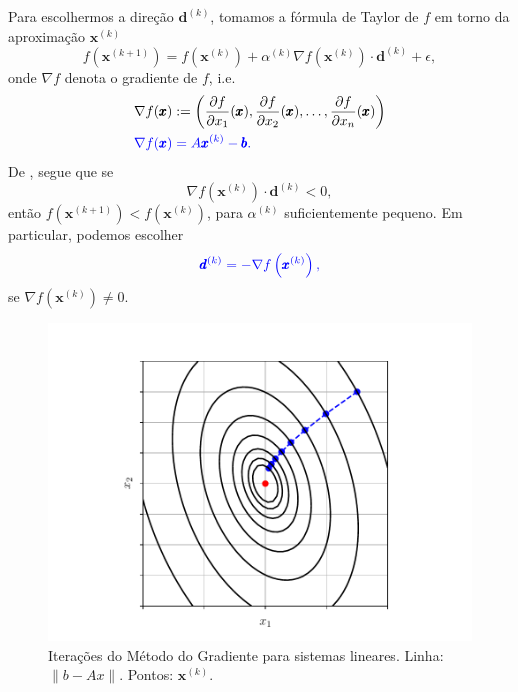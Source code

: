 Para escolhermos a direção $\pmb{d}^{(k)}$, tomamos a fórmula de Taylor de $f$ em torno da aproximação $\pmb{x}^{(k)}$
\begin{equation}\label{cap_sislin_sec_metg:eq:metg_taylor}
  f\left(\pmb{x}^{(k+1)}\right) = f\left(\pmb{x}^{(k)}\right) + \alpha^{(k)}\nabla f\left(\pmb{x}^{(k)}\right)\cdot \pmb{d}^{(k)} + \epsilon,
\end{equation}
onde $\nabla f$ denota o gradiente de $f$, i.e.
\begin{align}
  \nabla f(\pmb{x}) &:= \left(\frac{\partial f}{\partial x_1}(\pmb{x}), \frac{\partial f}{\partial x_2}(\pmb{x}), \dotsc, \frac{\partial f}{\partial x_n}(\pmb{x})\right)\\
  \color{blue}\nabla f(\pmb{x}) &\color{blue}= A\pmb{x}^{(k)}-\pmb{b}.
\end{align}
De \label{cap_sislin_sec_metg:eq:metg_taylor}, segue que se
\begin{equation}
  \nabla f\left(\pmb{x}^{(k)}\right)\cdot \pmb{d}^{(k)} < 0,
\end{equation}
então $f\left(\pmb{x}^{(k+1)}\right) < f\left(\pmb{x}^{(k)}\right)$, para $\alpha^{(k)}$ suficientemente pequeno. Em particular, podemos escolher
\begin{equation}\color{blue}\pmb{d}^{(k)} = -\nabla f\left(\pmb{x}^{(k)}\right),
\end{equation}
se $\nabla f(\pmb{x}^{(k)})\neq 0$.


\begin{figure}[H]
  \centering
  \includegraphics[width=\textwidth]{./cap_sislin/dados/fig_mg/fig}
  \caption{Iterações do Método do Gradiente para sistemas lineares. Linha: $\|b-Ax\|$. Pontos: $\pmb{x}^{(k)}$.}
  \label{cap_sislin_sec_metg:fig:cap_sislin_sec_mg}
\end{figure}

